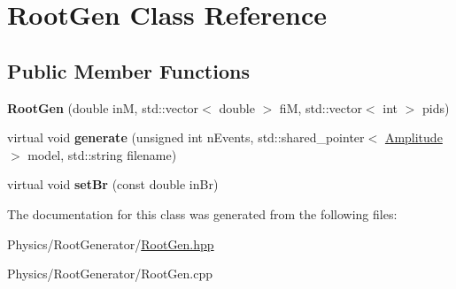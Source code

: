 \hypertarget{class_root_gen}{\section{Root\-Gen Class Reference}
\label{class_root_gen}
}
\subsection*{Public Member Functions}
\begin{DoxyCompactItemize}
\item 
\hypertarget{class_root_gen_a03cddacd1835a9101c3e4ae7f02d7d8b}{{\bfseries Root\-Gen} (double in\-M, std\-::vector$<$ double $>$ fi\-M, std\-::vector$<$ int $>$ pids)}\label{class_root_gen_a03cddacd1835a9101c3e4ae7f02d7d8b}

\item 
\hypertarget{class_root_gen_ace2df560a26922a4daf848e9c2332cc7}{virtual void {\bfseries generate} (unsigned int n\-Events, std\-::shared\-\_\-pointer$<$ \hyperlink{class_amplitude}{Amplitude} $>$ model, std\-::string filename)}\label{class_root_gen_ace2df560a26922a4daf848e9c2332cc7}

\item 
\hypertarget{class_root_gen_a6c289aa8e2d6f8917e5baa1c74f9162c}{virtual void {\bfseries set\-Br} (const double in\-Br)}\label{class_root_gen_a6c289aa8e2d6f8917e5baa1c74f9162c}

\end{DoxyCompactItemize}


The documentation for this class was generated from the following files\-:\begin{DoxyCompactItemize}
\item 
Physics/\-Root\-Generator/\hyperlink{_root_gen_8hpp}{Root\-Gen.\-hpp}\item 
Physics/\-Root\-Generator/Root\-Gen.\-cpp\end{DoxyCompactItemize}

